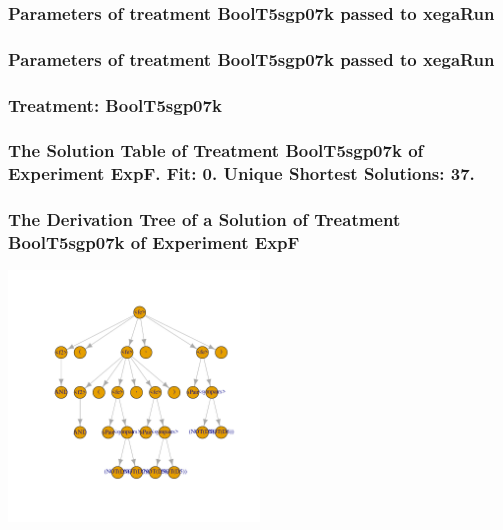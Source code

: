 \documentclass[18pt,c]{beamer}
\begin{document}

 \begin{frame}
 \fontsize{8pt}{9pt}\selectfont
 \frametitle{  Parameters of treatment BoolT5sgp07k passed to xegaRun
 }

 \label{ExpFtParmTable022.tex}  
 \end{frame}


 \begin{frame}
 \fontsize{8pt}{9pt}\selectfont
 \frametitle{  Parameters of treatment BoolT5sgp07k passed to xegaRun
 }

 \label{ExpFtParmTable023.tex}  
 \end{frame}

 \begin{frame}
 \fontsize{8pt}{9pt}\selectfont
 \frametitle{ Treatment: BoolT5sgp07k }

 \label{ExpFStatsTable011.tex}  
 \end{frame}

 \begin{frame}
 \fontsize{8pt}{9pt}\selectfont
 \frametitle{ The Solution Table of Treatment BoolT5sgp07k of Experiment ExpF. Fit: 0. Unique Shortest Solutions: 37. }

 \label{ExpFSolutionTable005.tex}  
 \end{frame}

 \begin{frame}
 \frametitle{ The Derivation Tree of a Solution of Treatment BoolT5sgp07k of Experiment ExpF }
 \begin{center}
\includegraphics[width=0.5\textwidth, angle=0]
{ExpFDerivationTreeFigure005.pdf}
 \end{center}
 \label{report/ExpFDerivationTreeFigure005.pdf}  
 \end{frame}
\end{document}
